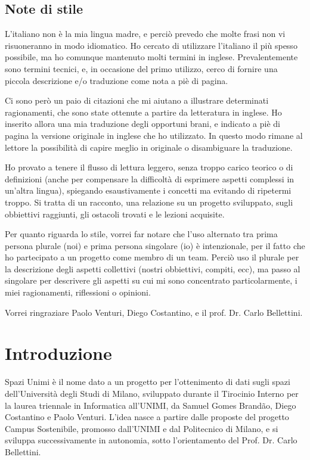\documentclass[12pt]{report}
\begin{document}
\section*{Note di stile}
L'italiano non è la mia lingua madre, e perciò prevedo che molte frasi
non vi risuoneranno in modo idiomatico. Ho cercato di utilizzare l'italiano
il più spesso possibile, ma ho comunque mantenuto molti termini in inglese.
Prevalentemente sono termini tecnici, e, in occasione del primo utilizzo,
cerco di fornire una piccola descrizione e/o traduzione come nota a piè di
pagina.

Ci sono però un paio di citazioni che mi aiutano a illustrare determinati
ragionamenti, che sono state ottenute a partire da letteratura in inglese.
Ho inserito allora una mia traduzione degli opportuni brani, e indicato
a piè di pagina la versione originale in inglese che ho utilizzato. In questo
modo rimane al lettore la possibilità di capire meglio in originale
o disambiguare la traduzione.  %

Ho provato a tenere il flusso di lettura leggero, senza troppo carico
teorico o di definizioni (anche per compensare la difficoltà di esprimere
aspetti complessi in un'altra lingua), spiegando esaustivamente i 
concetti ma evitando di ripetermi troppo. Si tratta di un racconto, 
una relazione su un progetto sviluppato, sugli obbiettivi raggiunti, 
gli ostacoli trovati e le lezioni acquisite.

Per quanto riguarda lo stile, vorrei far notare che l'uso alternato tra prima
persona plurale (noi) e prima persona singolare (io) è intenzionale, per
il fatto che ho partecipato a un progetto come membro di un team. Perciò
uso il plurale per la descrizione degli aspetti collettivi 
(nostri obbiettivi, compiti, ecc), ma passo al singolare per descrivere gli
aspetti su cui mi sono concentrato particolarmente, i miei
ragionamenti, riflessioni o opinioni.

%
%
Vorrei ringraziare Paolo Venturi, Diego Costantino, 
e il prof. Dr. Carlo Bellettini. 
\afterpreface


% 
% 
\chapter{Introduzione}
\label{cap:intro}

Spazi Unimi è il nome dato a un progetto per l'ottenimento di dati sugli 
spazi dell’Università degli Studi di Milano, sviluppato durante il 
Tirocinio Interno per la laurea triennale in Informatica all’UNIMI, 
da Samuel Gomes Brandão, Diego Costantino e Paolo Venturi. L'idea 
nasce a partire dalle proposte del progetto Campus Sostenibile, 
promosso dall’UNIMI e dal Politecnico di Milano, e si sviluppa 
successivamente in autonomia, sotto l'orientamento del Prof. Dr. Carlo Bellettini.
\end{document}
